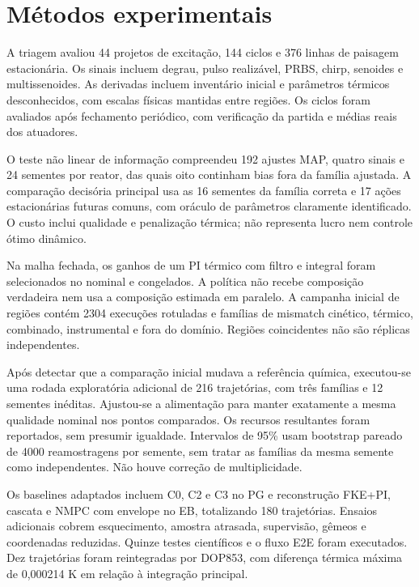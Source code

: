 \documentclass[
  11pt,
  letterpaper,
]{article}
\begin{document}
\hypertarget{muxe9todos-experimentais}{%
\section{Métodos experimentais}\label{muxe9todos-experimentais}}

A triagem avaliou 44 projetos de excitação, 144 ciclos e 376 linhas de
paisagem estacionária. Os sinais incluem degrau, pulso realizável, PRBS,
chirp, senoides e multissenoides. As derivadas incluem inventário
inicial e parâmetros térmicos desconhecidos, com escalas físicas
mantidas entre regiões. Os ciclos foram avaliados após fechamento
periódico, com verificação da partida e médias reais dos atuadores.

O teste não linear de informação compreendeu 192 ajustes MAP, quatro
sinais e 24 sementes por reator, das quais oito continham bias fora da
família ajustada. A comparação decisória principal usa as 16 sementes da
família correta e 17 ações estacionárias futuras comuns, com oráculo de
parâmetros claramente identificado. O custo inclui qualidade e
penalização térmica; não representa lucro nem controle ótimo dinâmico.

Na malha fechada, os ganhos de um PI térmico com filtro e integral foram
selecionados no nominal e congelados. A política não recebe composição
verdadeira nem usa a composição estimada em paralelo. A campanha inicial
de regiões contém 2304 execuções rotuladas e famílias de mismatch
cinético, térmico, combinado, instrumental e fora do domínio. Regiões
coincidentes não são réplicas independentes.

Após detectar que a comparação inicial mudava a referência química,
executou-se uma rodada exploratória adicional de 216 trajetórias, com
três famílias e 12 sementes inéditas. Ajustou-se a alimentação para
manter exatamente a mesma qualidade nominal nos pontos comparados. Os
recursos resultantes foram reportados, sem presumir igualdade.
Intervalos de 95\% usam bootstrap pareado de 4000 reamostragens por
semente, sem tratar as famílias da mesma semente como independentes. Não
houve correção de multiplicidade.

Os baselines adaptados incluem C0, C2 e C3 no PG e reconstrução FKE+PI,
cascata e NMPC com envelope no EB, totalizando 180 trajetórias. Ensaios
adicionais cobrem esquecimento, amostra atrasada, supervisão, gêmeos e
coordenadas reduzidas. Quinze testes científicos e o fluxo E2E foram
executados. Dez trajetórias foram reintegradas por DOP853, com diferença
térmica máxima de 0,000214 K em relação à integração principal.
\end{document}
